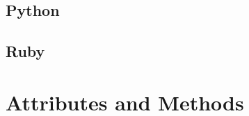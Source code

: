 \documentclass{KodeBook}
\begin{document}


\subsection{Python}



\subsection{Ruby}




\section{Attributes and Methods}



\ifx\wholebook\relax\else
% 
% 
	
\end{document}

